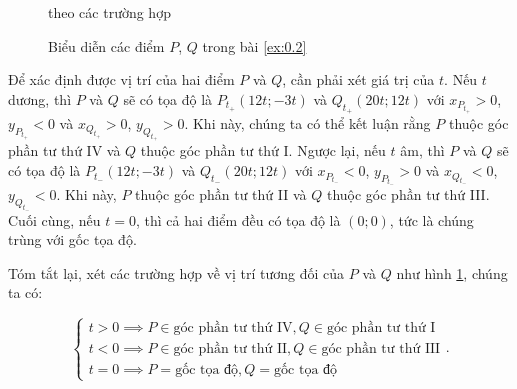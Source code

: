 \begin{figure}[h]
   \centering
   \caption{Biểu diễn các điểm $P$, $Q$ trong bài \ref{ex:0.2}} theo các trường hợp
   \label{fig:do_thi:mat_phang:tdvgPQ}
\end{figure}

Để xác định được vị trí của hai điểm $P$ và $Q$, cần phải xét giá trị của $t$. Nếu $t$ dương, thì $P$ và $Q$ sẽ có tọa độ là $P_{t_+}(12t;-3t)$ và $Q_{t_+}(20t;12t)$ với $x_{P_{t_+}}>0$, $y_{P_{t_+}}<0$ và $x_{Q_{t_+}}>0$, $y_{Q_{t_+}}>0$. Khi này, chúng ta có thể kết luận rằng $P$ thuộc góc phần tư thứ IV và $Q$ thuộc góc phần tư thứ I. Ngược lại, nếu $t$ âm, thì $P$ và $Q$ sẽ có tọa độ là $P_{t_-}(12t;-3t)$ và $Q_{t_-}(20t;12t)$ với $x_{P_{t_-}}<0$, $y_{P_{t_-}}>0$ và $x_{Q_{t_-}}<0$, $y_{Q_{t_-}}<0$. Khi này, $P$ thuộc góc phần tư thứ II và $Q$ thuộc góc phần tư thứ III. Cuối cùng, nếu $t=0$, thì cả hai điểm đều có tọa độ là $(0;0)$, tức là chúng trùng với gốc tọa độ.

Tóm tắt lại, xét các trường hợp về vị trí tương đối của $P$ và $Q$ như hình \ref{fig:do_thi:mat_phang:tdvgPQ}, chúng ta có:

$$
   \begin{cases}
      t>0 \implies P \in \text{góc phần tư thứ IV}, Q \in \text{góc phần tư thứ I} \\
      t<0 \implies P \in \text{góc phần tư thứ II}, Q \in \text{góc phần tư thứ III} \\
      t=0 \implies P = \text{gốc tọa độ}, Q = \text{gốc tọa độ}
   \end{cases}.
$$

